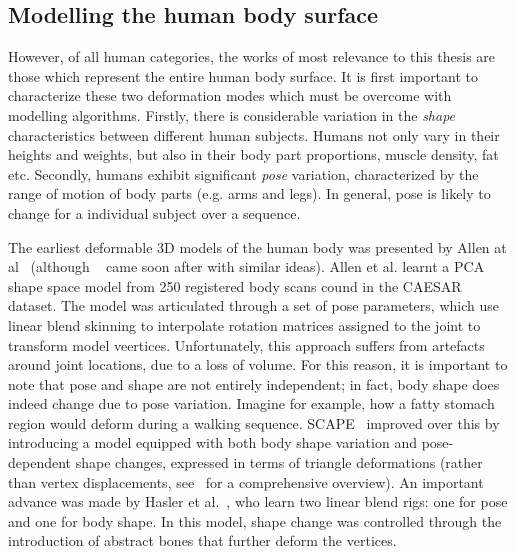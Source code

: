 




\subsection{Modelling the human body surface}


However, of all human categories, the works of most relevance to this thesis are those which represent the entire human body surface. It is first important to characterize these two deformation modes which must be overcome with modelling algorithms. Firstly, there is considerable variation in the \emph{shape} characteristics between different human subjects. Humans not only vary in their heights and weights, but also in their body part proportions, muscle density, fat etc. Secondly, humans exhibit significant \emph{pose} variation, characterized by the range of motion of body parts (e.g. arms and legs). In general, pose is likely to change for a individual subject over a sequence. 

The earliest deformable 3D models of the human body was presented by Allen at al~\cite{xxx} (although ~\cite{xxx} came soon after with similar ideas). Allen et al. learnt a PCA shape space model from 250 registered body scans cound in the CAESAR dataset. The model was articulated through a set of pose parameters, which use linear blend skinning to interpolate rotation matrices assigned to the joint to transform model veertices. Unfortunately, this approach suffers from artefacts around joint locations, due to a loss of volume. For this reason, it is important to note that pose and shape are not entirely independent; in fact, body shape does indeed change due to pose variation. Imagine for example, how a fatty stomach region would deform during a walking sequence. SCAPE~\cite{anguelov05scape} improved over this by introducing a model equipped with both body shape variation and pose-dependent shape changes, expressed in terms of triangle deformations (rather than vertex displacements, see~\cite{loper15smpl} for a comprehensive overview). An important advance was made by Hasler et al.~\cite{xxx}, who learn two linear blend rigs: one for pose and one for body shape. In this model, shape change was controlled through the introduction of abstract bones that further deform the vertices.

